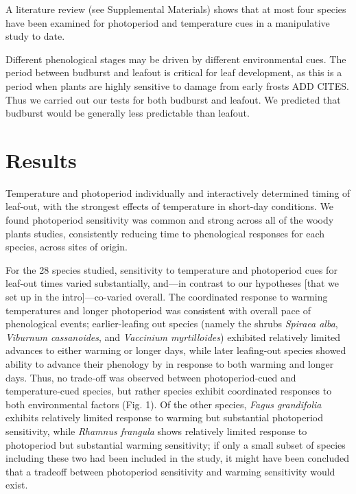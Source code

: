 \documentclass{article}
\begin{document}
A literature review (see Supplemental Materials) shows that at most four species have been examined for photoperiod and temperature cues in a manipulative study to date. 

Different phenological stages may be driven by different environmental cues. The period between budburst and leafout is critical for leaf development, as this is a period when plants are highly sensitive to damage from early frosts ADD CITES. Thus we carried out our tests for both budburst and leafout. We predicted that budburst would be generally less predictable than leafout. %


\section*{Results}

Temperature and photoperiod individually and interactively determined timing of leaf-out, with the strongest effects of temperature in short-day conditions. We found photoperiod sensitivity was common and strong across all of the woody plants studies, consistently reducing time to phenological responses for each species, across sites of origin. 

For the 28 species studied, sensitivity to temperature and photoperiod cues for leaf-out times varied substantially, and---in contrast to our hypotheses [that we set up in the intro]---co-varied overall. The coordinated response to warming temperatures and longer photoperiod was consistent with overall pace of phenological events; earlier-leafing out species (namely the shrubs \emph{Spiraea alba}, \emph{Viburnum cassanoides}, and \emph{Vaccinium myrtilloides}) exhibited relatively limited advances to either warming or longer days, while later leafing-out species showed ability to advance their phenology by in response to both warming and longer days. Thus, no trade-off was observed between photoperiod-cued and temperature-cued species, but rather species exhibit coordinated responses to both environmental factors (Fig. 1). Of the other species, \emph{Fagus grandifolia} exhibits relatively limited response to warming but substantial photoperiod sensitivity, while \emph{Rhamnus frangula} shows relatively limited response to photoperiod but substantial warming sensitivity; if only a small subset of species including these two had been included in the study, it might have been concluded that a tradeoff between photoperiod sensitivity and warming sensitivity would exist. %
\end{document}
